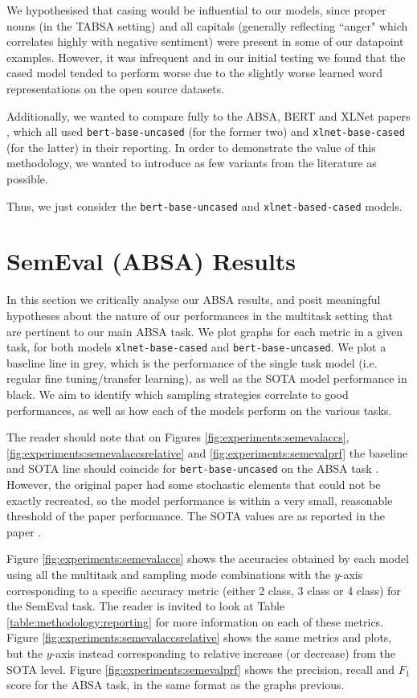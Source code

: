We hypothesised that casing would be influential to our models, since proper nouns (in the TABSA setting) and all capitals (generally reflecting ``anger" which correlates highly with negative sentiment) were present in some of our datapoint examples. However, it was infrequent and in our initial testing we found that the cased model tended to perform worse due to the slightly worse learned word representations on the open source datasets.

Additionally, we wanted to compare fully to the ABSA, BERT and XLNet papers \cite{Sun2019, Devlin2018, Yang2019}, which all used \texttt{bert-base-uncased} (for the former two) and \texttt{xlnet-base-cased} (for the latter) in their reporting. In order to demonstrate the value of this methodology, we wanted to introduce as few variants from the literature as possible.

Thus, we just consider the \texttt{bert-base-uncased} and \texttt{xlnet-based-cased} models.
\section{SemEval (ABSA) Results}
In this section we critically analyse our ABSA results, and posit meaningful hypotheses about the nature of our performances in the multitask setting that are pertinent to our main ABSA task. We plot graphs for each metric in a given task, for both models \texttt{xlnet-base-cased} and \texttt{bert-base-uncased}. We plot a baseline line in grey, which is the performance of the single task model (i.e. regular fine tuning/transfer learning), as well as the SOTA model performance in black. We aim to identify which sampling strategies correlate to good performances, as well as how each of the models perform on the various tasks.

The reader should note that on Figures \ref{fig:experiments:semevalaccs}, \ref{fig:experiments:semevalaccsrelative} and \ref{fig:experiments:semevalprf} the baseline and SOTA line should coincide for \texttt{bert-base-uncased} on the ABSA task . However, the original paper had some stochastic elements that could not be exactly recreated, so the model performance is within a very small, reasonable threshold of the paper performance. The SOTA values are as reported in the paper \cite{Sun2019}.

Figure \ref{fig:experiments:semevalaccs} shows the accuracies obtained by each model using all the multitask and sampling mode combinations with the $y$-axis corresponding to a specific accuracy metric (either 2 class, 3 class or 4 class) for the SemEval task. The reader is invited to look at Table \ref{table:methodology:reporting} for more information on each of these metrics. Figure \ref{fig:experiments:semevalaccsrelative} shows the same metrics and plots, but the $y$-axis instead corresponding to relative increase (or decrease) from the SOTA level. Figure \ref{fig:experiments:semevalprf} shows the precision, recall and $F_1$ score for the ABSA task, in the same format as the graphs previous.

